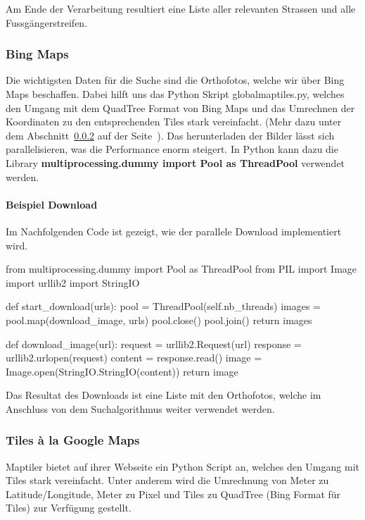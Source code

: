 Am Ende der Verarbeitung resultiert eine Liste aller relevanten Strassen und alle Fussgängerstreifen.
\newpage
\subsubsection{Bing Maps}
Die wichtigsten Daten für die Suche sind die Orthofotos, welche wir über Bing Maps beschaffen. Dabei hilft uns das Python Skript globalmaptiles.py, welches den Umgang mit dem QuadTree Format von Bing Maps und das Umrechnen der Koordinaten zu den entsprechenden Tiles stark vereinfacht. (Mehr dazu unter dem Abschnitt~\ref{subsec:tiles} auf der Seite~\pageref{subsec:tiles}). Das herunterladen der Bilder lässt sich parallelisieren, was die Performance enorm steigert. In Python kann dazu die Library \textbf{multiprocessing.dummy import Pool as ThreadPool} verwendet werden.

\paragraph{Beispiel Download} Im Nachfolgenden Code ist gezeigt, wie der parallele Download implementiert wird. \\
\begin{python}
from multiprocessing.dummy import Pool as ThreadPool
from PIL import Image
import urllib2
import StringIO

def start_download(urls):
     pool = ThreadPool(self.nb_threads)       
     images = pool.map(download_image, urls)
     pool.close()
     pool.join()
     return images

def download_image(url):
    request = urllib2.Request(url)
    response = urllib2.urlopen(request)
    content = response.read()
    image = Image.open(StringIO.StringIO(content))
    return image

\end{python}

Das Resultat des Downloads ist eine Liste mit den Orthofotos, welche im Anschluss von dem Suchalgorithmus weiter verwendet werden.
\newpage
\subsubsection{Tiles à la Google Maps}
\label{subsec:tiles}
\Gls{Maptiler} bietet auf ihrer Webseite \cite{Tiles} ein Python Script an, welches den Umgang mit Tiles stark vereinfacht. Unter anderem wird die Umrechnung von Meter zu Latitude/Longitude, Meter zu Pixel und Tiles zu QuadTree \cite{quadtree} (Bing Format für Tiles) zur Verfügung gestellt.\\

